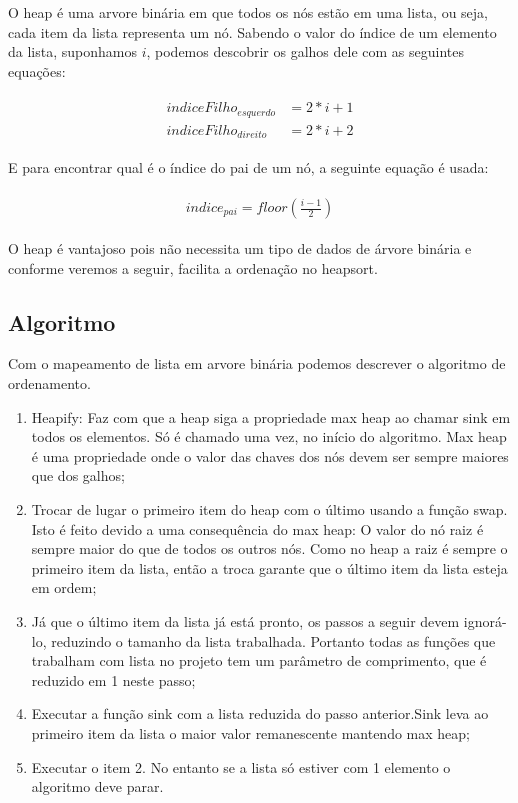 O heap é uma arvore binária em que todos os nós estão em uma lista, ou seja, cada item da lista representa um nó. Sabendo o valor do índice de um elemento da lista, suponhamos $i$, podemos descobrir os galhos dele com as seguintes equações:

\begin{gather}
\begin{align}
indiceFilho_{esquerdo} &= 2*i+1 \\
indiceFilho_{direito}  &= 2*i+2
\end{align}
\end{gather}

E para encontrar qual é o índice do pai de um nó, a seguinte equação é usada:

\begin{gather}
\begin{align}
indice_{pai} = floor(\frac{i-1}{2})
\end{align}
\end{gather}

O heap é vantajoso pois não necessita um tipo de dados de árvore binária e conforme veremos a seguir, facilita a ordenação no heapsort.
    
\subsection{Algoritmo}

Com o mapeamento de lista em arvore binária podemos descrever o algoritmo de ordenamento.

\begin{enumerate}
    \item Heapify: Faz com que a heap siga a propriedade max heap ao chamar sink em todos os elementos. Só é chamado uma vez, no início do algoritmo. Max heap é uma propriedade onde o valor das chaves dos nós devem ser sempre maiores que dos galhos;
    \item Trocar de lugar o primeiro item do heap com o último usando a função swap. Isto é feito devido a uma consequência do max heap: O valor do nó raiz é sempre maior do que de todos os outros nós. Como no heap a raiz é sempre o primeiro item da lista, então a troca garante que o último item da lista esteja em ordem;
    \item Já que o último item da lista já está pronto, os passos a seguir devem ignorá-lo, reduzindo o tamanho da lista trabalhada. Portanto todas as funções que trabalham com lista no projeto tem um parâmetro de comprimento, que é reduzido em 1 neste passo;
    \item Executar a função sink com a lista reduzida do passo anterior.Sink leva ao primeiro item da lista o maior valor remanescente  mantendo max heap;
    \item Executar o item 2. No entanto se a lista só estiver com 1 elemento o algoritmo deve parar.
\end{enumerate}



